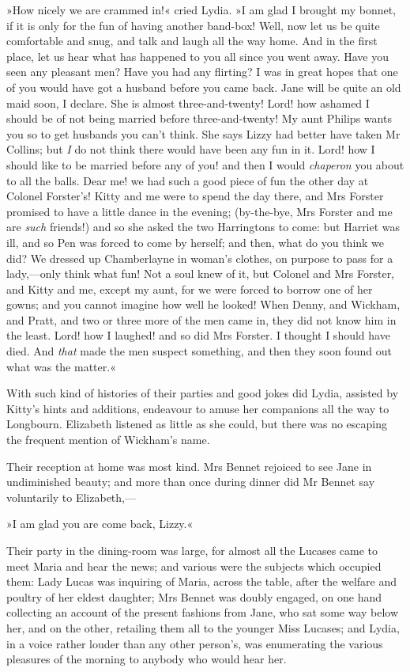 »How nicely we are crammed in!« cried Lydia. »I am glad I brought my bonnet, if it is only for the fun of having another band-box! Well, now let us be quite comfortable and snug, and talk and laugh all the way home. And in the first place, let us hear what has happened to you all since you went away. Have you seen any pleasant men? Have you had any flirting? I was in great hopes that one of you would have got a husband before you came back. Jane will be quite an old maid soon, I declare. She is almost three-and-twenty! Lord! how ashamed I should be of not being married before three-and-twenty! My aunt Philips wants you so to get husbands you can't think. She says Lizzy had better have taken Mr Collins; but \textit{I} do not think there would have been any fun in it. Lord! how I should like to be married before any of you! and then I would \textit{chaperon} you about to all the balls. Dear me! we had such a good piece of fun the other day at Colonel Forster's! Kitty and me were to spend the day there, and Mrs Forster promised to have a little dance in the evening; (by-the-bye, Mrs Forster and me are \textit{such} friends!) and so she asked the two Harringtons to come: but Harriet was ill, and so Pen was forced to come by herself; and then, what do you think we did? We dressed up Chamberlayne in woman's clothes, on purpose to pass for a lady,—only think what fun! Not a soul knew of it, but Colonel and Mrs Forster, and Kitty and me, except my aunt, for we were forced to borrow one of her gowns; and you cannot imagine how well he looked! When Denny, and Wickham, and Pratt, and two or three more of the men came in, they did not know him in the least. Lord! how I laughed! and so did Mrs Forster. I thought I should have died. And \textit{that} made the men suspect something, and then they soon found out what was the matter.«

With such kind of histories of their parties and good jokes did Lydia, assisted by Kitty's hints and additions, endeavour to amuse her companions all the way to Longbourn. Elizabeth listened as little as she could, but there was no escaping the frequent mention of Wickham's name.

Their reception at home was most kind. Mrs Bennet rejoiced to see Jane in undiminished beauty; and more than once during dinner did Mr Bennet say voluntarily to Elizabeth,—

»I am glad you are come back, Lizzy.«

Their party in the dining-room was large, for almost all the Lucases came to meet Maria and hear the news; and various were the subjects which occupied them: Lady Lucas was inquiring of Maria, across the table, after the welfare and poultry of her eldest daughter; Mrs Bennet was doubly engaged, on one hand collecting an account of the present fashions from Jane, who sat some way below her, and on the other, retailing them all to the younger Miss Lucases; and Lydia, in a voice rather louder than any other person's, was enumerating the various pleasures of the morning to anybody who would hear her.

